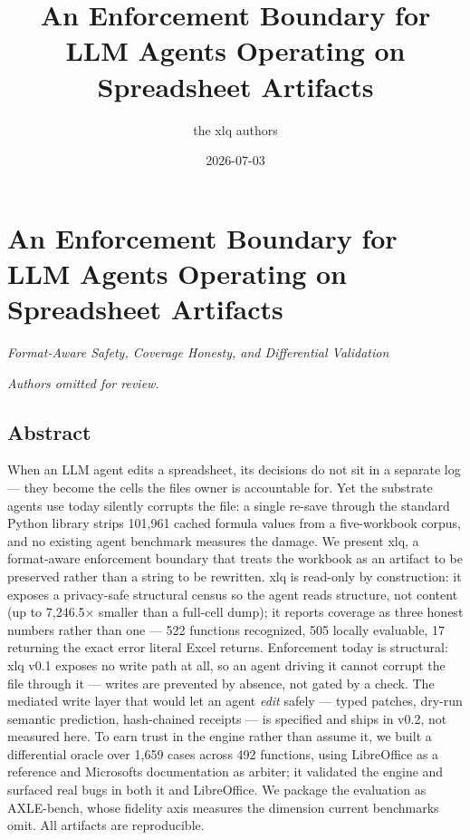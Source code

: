 \documentclass[
]{article}
\title{An Enforcement Boundary for LLM Agents Operating on Spreadsheet
Artifacts}
\author{the xlq authors}
\date{2026-07-03}
\begin{document}
\maketitle

{
\setcounter{tocdepth}{3}
\tableofcontents
}
\section{An Enforcement Boundary for LLM Agents Operating on Spreadsheet
Artifacts}\label{an-enforcement-boundary-for-llm-agents-operating-on-spreadsheet-artifacts}

\emph{Format-Aware Safety, Coverage Honesty, and Differential
Validation}

\emph{Authors omitted for review.}

\subsection{Abstract}\label{abstract}

When an LLM agent edits a spreadsheet, its decisions do not sit in a
separate log --- they become the cells the file\textquotesingle s owner
is accountable for. Yet the substrate agents use today silently corrupts
the file: a single re-save through the standard Python library strips
101,961 cached formula values from a five-workbook corpus, and no
existing agent benchmark measures the damage. We present xlq, a
format-aware enforcement boundary that treats the workbook as an
artifact to be preserved rather than a string to be rewritten. xlq is
read-only by construction: it exposes a privacy-safe structural census
so the agent reads structure, not content (up to 7,246.5× smaller than a
full-cell dump); it reports coverage as three honest numbers rather than
one --- 522 functions recognized, 505 locally evaluable, 17 returning
the exact error literal Excel returns. Enforcement today is structural:
xlq v0.1 exposes no write path at all, so an agent driving it cannot
corrupt the file through it --- writes are prevented by absence, not
gated by a check. The mediated write layer that would let an agent
\emph{edit} safely --- typed patches, dry-run semantic prediction,
hash-chained receipts --- is specified and ships in v0.2, not measured
here. To earn trust in the engine rather than assume it, we built a
differential oracle over 1,659 cases across 492 functions, using
LibreOffice as a reference and Microsoft\textquotesingle s documentation
as arbiter; it validated the engine and surfaced real bugs in both it
and LibreOffice. We package the evaluation as AXLE-bench, whose fidelity
axis measures the dimension current benchmarks omit. All artifacts are
reproducible.
\end{document}

